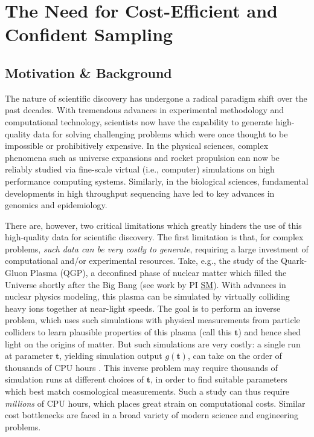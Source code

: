 \documentclass[11pt]{NSFamsart}
\newcommand{\cmtS}[1]{{\color{blue}{(Simon: #1)}}}
\newcommand{\SM}{\hyperlink{SMlink}{SM}\xspace}
\newcommand{\bt}{{\boldsymbol{t}}}
\begin{document}


\section{The Need for Cost-Efficient and Confident Sampling}

\subsection{Motivation \& Background} The nature of scientific discovery has undergone a radical paradigm shift over the past decades. With tremendous advances in experimental methodology and computational technology, scientists now have the capability to generate high-quality data for solving challenging problems which were once thought to be impossible or prohibitively expensive. In the physical sciences, complex phenomena such as universe expansions \citep{kaufman2011efficient} and rocket propulsion \citep{mak2018efficient,yeh2018common} can now be reliably studied via fine-scale virtual (i.e., computer) simulations on high performance computing systems. Similarly, in the biological sciences, fundamental developments in high throughput sequencing have led to key advances in genomics and epidemiology.

There are, however, two critical limitations which greatly hinders the use of this high-quality data for scientific discovery. The first limitation is that, for complex problems, \textit{such data can be very costly to generate}, requiring a large investment of computational and/or experimental resources. Take, e.g., the study of the Quark-Gluon Plasma (QGP), a deconfined phase of nuclear matter which filled the Universe shortly after the Big Bang (see work by PI \SM \cite{everett2021multisystem,everett2021phenomenological,liyanage2022efficient,ji2021graphical}). With advances in nuclear physics modeling, this plasma can be simulated by virtually colliding heavy ions together at near-light speeds. The goal is to perform an {inverse problem}, which uses such simulations with physical measurements from particle colliders to learn plausible properties of this plasma (call this $\bt$) and hence shed light on the origins of matter. But such simulations are very costly: a single run at parameter $\bt$, yielding simulation output $g(\bt)$, can take on the order of {thousands} of CPU hours \citep{everett2021multisystem}. This inverse problem may require {thousands} of simulation runs at different choices of $\bt$, in order to find suitable parameters which best match cosmological measurements. Such a study can thus require \textit{millions} of CPU hours, which places great strain on computational costs. Similar cost bottlenecks are faced in a broad variety of modern science and engineering problems. 
\end{document}
